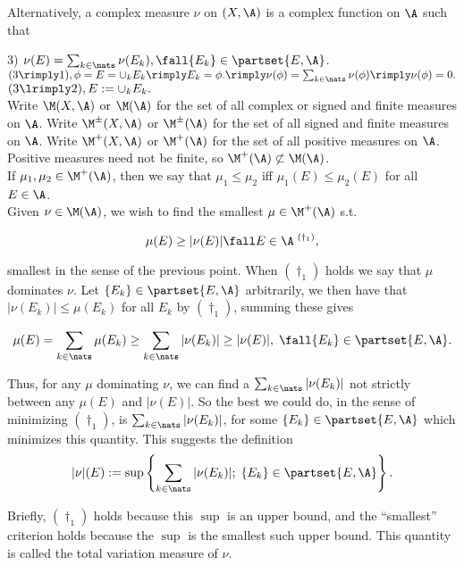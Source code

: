 Alternatively, a complex measure $\nu$ on $(X,\A)$ is a complex function on $\A$ such that

3) $\nu(E) = \sum_{k \in \nats} \nu(E_k), \fall \{ E_k\} \in \partset{E, \A}$.\\

$(3 \rimply 1), \phi = E = \cup_k E_k \rimply E_k = \phi. \rimply \nu(\phi) = \sum_{k \in \nats } \nu(\phi) \rimply \nu(\phi) = 0.$ $(3 \lrimply 2), E := \cup_k E_k.$ \\



Write $\M(X,\A)$ or $\M(\A)$ for the set of all complex or signed and finite measures on $\A$.
Write $\M^\pm(X,\A)$ or $\M^\pm(\A)$ for the set of all signed and finite measures on $\A$.
Write $\M^+(X,\A)$ or $\M^+(\A)$ for the set of all positive measures on $\A$. 
Positive measures need not be finite, so $\M^+(\A) \not \subset \M(\A)$.
\\



If $\mu_1,\mu_2 \in \M^+(\A)$, then we say that $\mu_1 \le \mu_2$ iff $\mu_1(E) \le \mu_2(E)$ for all $E \in \A$.\\

Given $\nu \in \M(\A)$, we wish to find the smallest $\mu \in \M^+(\A)$ s.t.

$$
     \mu(E)  \ge |\nu(E)| \fall E \in \A  \; {}^{(\dagger_1)},
$$
 
\noindent
smallest in the sense of the previous point. When ${(\dagger_1)}$ holds we say that $\mu$ dominates $\nu$.  Let $\{ E_k \} \in \partset{E,\A}$ arbitrarily, we then have that $|\nu(E_k)| \le \mu(E_k)$ for all $E_k$ by ${(\dagger_1)}$, summing these gives 

$$
\mu(E) = \sum_{k \in \nats} \mu(E_k) \ge \sum_{k \in \nats} |\nu(E_k)| \ge | \nu(E)|, \; \fall \{ E_k\} \in \partset{E, \A}.
$$

\noindent
Thus, for any $\mu$ dominating $\nu$, we can find a $\sum_{k \in \nats} |\nu(E_k)|$ not strictly between any $\mu(E)$ and $|\nu(E)|$. So the best we could do, in the sense of minimizing ${(\dagger_1)}$, is $\sum_{k \in \nats} |\nu(E_k)|$, for some $ \{ E_k\} \in \partset{E, \A}$ which minimizes this quantity. This suggests the definition\\

$$
|\nu|(E) := \sup \left\{  \sum_{k \in \nats} |\nu(E_k)| ; \; \{ E_k\} \in \partset{E, \A}  \right\}.
$$

\noindent   
Briefly, ${(\dagger_1)}$ holds because this $\sup$ is an upper bound, and the ``smallest'' criterion holds because the $\sup$ is the smallest such upper bound. This quantity is called the total variation measure of $\nu$. \\






